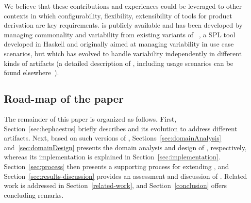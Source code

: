 We believe that these contributions and experiences could be leveraged to other contexts in which configurability, flexibility, extensibility of tools for product derivation are key requirements. \hpl{} is publicly available  and has been developed by managing commonality and variability from existing variants of \hp~\cite{rbonifacio:sbcars2009}, a SPL tool developed in Haskell and originally aimed at managing variability in use case scenarios, but which has evolved to handle variability independently in different kinds of artifacts (a detailed description of \hp, including usage scenarios can be found elsewhere~\cite{rbonifacio:sbcars2009}). 


\bigskip

\subsection*{Road-map of the paper}

The remainder of this paper is organized as follows. First, Section~\ref{sec:hephaestus} briefly describes \hp{} and its evolution to address different artifacts. Next, based on such versions of \hp, Sections~\ref{sec:domainAnalysis} and~\ref{sec:domainDesign} presents the domain analysis and design of \hpl, respectively, whereas its implementation is explained in Section~\ref{sec:implementation}. Section~\ref{sec:process} then presents a supporting process for extending \hpl, and Section~\ref{sec:results-discussion} provides an assessment and discussion of \hpl. Related work is addressed in Section~\ref{related-work}, and Section~\ref{conclusion} offers concluding remarks.

